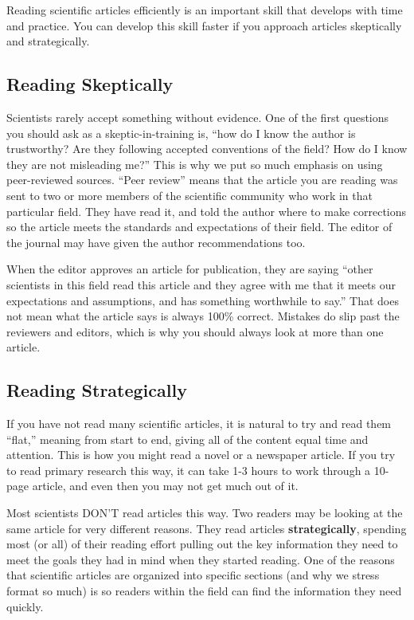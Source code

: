 \documentclass[
]{book}
\begin{document}
Reading scientific articles efficiently is an important skill that develops with time and practice. You can develop this skill faster if you approach articles skeptically and strategically.

\hypertarget{reading-skeptically}{%
\subsection{Reading Skeptically}\label{reading-skeptically}}

Scientists rarely accept something without evidence. One of the first questions you should ask as a skeptic-in-training is, ``how do I know the author is trustworthy? Are they following accepted conventions of the field? How do I know they are not misleading me?'' This is why we put so much emphasis on using peer-reviewed sources. ``Peer review'' means that the article you are reading was sent to two or more members of the scientific community who work in that particular field. They have read it, and told the author where to make corrections so the article meets the standards and expectations of their field. The editor of the journal may have given the author recommendations too.

When the editor approves an article for publication, they are saying ``other scientists in this field read this article and they agree with me that it meets our expectations and assumptions, and has something worthwhile to say.'' That does not mean what the article says is always 100\% correct. Mistakes do slip past the reviewers and editors, which is why you should always look at more than one article.

\hypertarget{reading-strategically}{%
\subsection{Reading Strategically}\label{reading-strategically}}

If you have not read many scientific articles, it is natural to try and read them ``flat,'' meaning from start to end, giving all of the content equal time and attention. This is how you might read a novel or a newspaper article. If you try to read primary research this way, it can take 1-3 hours to work through a 10-page article, and even then you may not get much out of it.

Most scientists DON'T read articles this way. Two readers may be looking at the same article for very different reasons. They read articles \textbf{strategically}, spending most (or all) of their reading effort pulling out the key information they need to meet the goals they had in mind when they started reading. One of the reasons that scientific articles are organized into specific sections (and why we stress format so much) is so readers within the field can find the information they need quickly.
\end{document}

